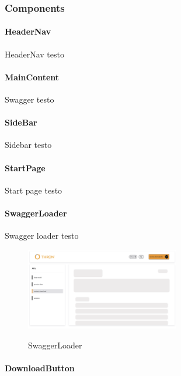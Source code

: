 \subsubsection{Components}\label{subsubsec:components}

\paragraph{HeaderNav}\label{par:header-nav}

HeaderNav testo

\paragraph{MainContent}\label{par:main-content}
Swagger testo

\paragraph{SideBar}\label{par:side-bar}

Sidebar testo

\paragraph{StartPage}\label{par:start-page}

Start page testo

\paragraph{SwaggerLoader}\label{par:swagger-loader}

Swagger loader testo
\begin{figure}[ht]
  \centering
  \includegraphics[width=0.6\textwidth, alt={Skeleton loader di caricamento per contenuto principale}]{images/frontend/SwaggerLoader.jpg}
  \caption{SwaggerLoader}\label{fig:swagger-loader}
\end{figure}

\paragraph{DownloadButton}\label{par:download-button}

